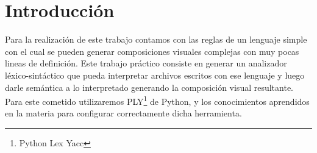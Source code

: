 \documentclass[10pt,a4paper]{article}
\begin{document}

\fecha{\today}



\maketitle

\section{Introducción}
Para la realización de este trabajo contamos con las reglas de un lenguaje simple con el cual se pueden generar composiciones visuales complejas con muy pocas lineas de definición. Este trabajo práctico consiste en generar un analizador léxico-sintáctico que pueda interpretar archivos escritos con ese lenguaje y luego darle semántica a lo interpretado generando la composición visual resultante. Para este cometido utilizaremos PLY\footnote{Python Lex Yacc} de Python, y los conocimientos aprendidos en la materia para configurar correctamente dicha herramienta.
\end{document}
